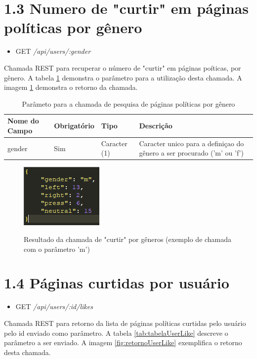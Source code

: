 \documentclass[
	12pt,				%
	oneside,			%
	a4paper,			%
	english,			%
	brazil				%
	]{abntex2ppgsi}
\begin{document}
\begin{apendicesenv}
\section*{1.3 Numero de "curtir" em páginas políticas por gênero}

\begin{itemize}
	\item {GET} \textit{/api/users/:gender}
\end{itemize}

Chamada REST para recuperar o número de "curtir" em páginas poíticas, por gênero. A tabela \ref{tab:tabelaGender} demonstra o parâmetro para a utilização desta chamada. A imagem \ref{fig:retornoGender} demonstra o retorno da chamada.

 \begin{table}[htbp]
	\centering
	\caption{Parâmeto para a chamada de pesquisa de páginas políticas por gênero}
	\begin{tabular}{p{1.5in} p{1in} p{1in} p{1.5in}  } \hline
		Nome do Campo 		& 		Obrigatório 		& 		Tipo 		&		 Descrição \\ \hline
		gender				& 		Sim					& Caracter (1)		&
		Caracter unico para a definiçao do gênero a ser procurado ('m' ou 'f') 
	\end{tabular}
	\label{tab:tabelaGender}
\end{table}

\begin{figure}[H]
	\centering
	\caption{Resultado da chamada de "curtir" por gêneros (exemplo de chamada com o parâmetro 'm')}
	\includegraphics[scale=1]{resultadoGender.png}
	\label{fig:retornoGender}
\end{figure}


\section*{1.4 Páginas curtidas por usuário}

\begin{itemize}
	\item {GET} \textit{/api/users/:id/likes}
\end{itemize}

Chamada REST para retorno da lista de páginas políticas curtidas pelo usuário pelo id enviado como parâmetro. A tabela \ref{tab:tabelaUserLike} descreve o parâmetro a ser enviado. A imagem \ref{fig:retornoUserLike} exemplifica o retorno desta chamada.


\end{apendicesenv}
\end{document}
